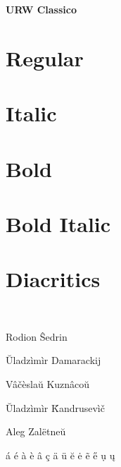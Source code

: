 \documentclass{article}
\begin{document}
\begin{center}\huge\bf URW Classico
\end{center}


\section*{Regular}
\lipsum[1]

\section*{Italic}
\textit{\lipsum[2]}

\section*{Bold}

\textbf{\lipsum[3]}

\section*{Bold Italic}

\textbf{\textit{\lipsum[4]}}

\section*{Diacritics}

\ \par

Rodion \^{S}edrin 

\u{U}ladz\`{i}m\`{i}r Damarackij

V\^{a}\v{c}\`{e}sla\u{u} Kuzn\^{a}co\u{u}

\u{U}ladz\`{i}m\`{i}r \v{K}andrusev\`{i}\v{c}

Aleg Zal\"{e}tne\u{u}

\'{a}
\'{e}
\`{a}
\`{e}
\^{a}
\c{c}
\"{a}
\"{u}
\u{e}
\.{e}
\~{e}
\H{e}
\d{u}
\k{u}
\end{document}
